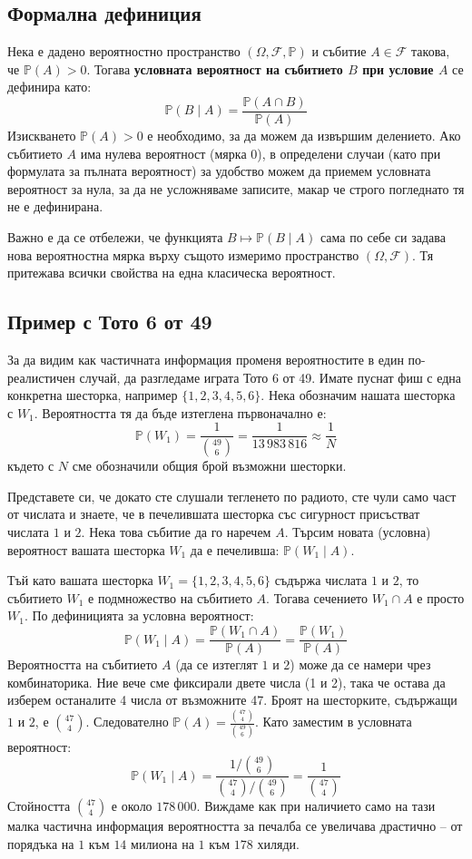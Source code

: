 \documentclass{article}
\begin{document}
\subsection{Формална дефиниция}

Нека е дадено вероятностно пространство $(\Omega, \mathcal{F}, \mathbb{P})$ и събитие $A \in \mathcal{F}$ такова, че $\mathbb{P}(A) > 0$. Тогава \textbf{условната вероятност на събитието $B$ при условие $A$} се дефинира като:
\[
\mathbb{P}(B \mid A) = \frac{\mathbb{P}(A \cap B)}{\mathbb{P}(A)}
\]
Изискването $\mathbb{P}(A) > 0$ е необходимо, за да можем да извършим делението. Ако събитието $A$ има нулева вероятност (мярка $0$), в определени случаи (като при формулата за пълната вероятност) за удобство можем да приемем условната вероятност за нула, за да не усложняваме записите, макар че строго погледнато тя не е дефинирана.

Важно е да се отбележи, че функцията $B \mapsto \mathbb{P}(B \mid A)$ сама по себе си задава нова вероятностна мярка върху същото измеримо пространство $(\Omega, \mathcal{F})$. Тя притежава всички свойства на една класическа вероятност.

\subsection{Пример с Тото 6 от 49}

За да видим как частичната информация променя вероятностите в един по-реалистичен случай, да разгледаме играта Тото 6 от 49. Имате пуснат фиш с една конкретна шесторка, например $\{1, 2, 3, 4, 5, 6\}$. Нека обозначим нашата шесторка с $W_1$.
Вероятността тя да бъде изтеглена първоначално е:
\[
\mathbb{P}(W_1) = \frac{1}{\binom{49}{6}} = \frac{1}{13\,983\,816} \approx \frac{1}{N}
\]
където с $N$ сме обозначили общия брой възможни шесторки.

Представете си, че докато сте слушали тегленето по радиото, сте чули само част от числата и знаете, че в печелившата шесторка със сигурност присъстват числата $1$ и $2$. Нека това събитие да го наречем $A$. Търсим новата (условна) вероятност вашата шесторка $W_1$ да е печеливша: $\mathbb{P}(W_1 \mid A)$.

Тъй като вашата шесторка $W_1 = \{1, 2, 3, 4, 5, 6\}$ съдържа числата $1$ и $2$, то събитието $W_1$ е подмножество на събитието $A$. Тогава сечението $W_1 \cap A$ е просто $W_1$.
По дефиницията за условна вероятност:
\[
\mathbb{P}(W_1 \mid A) = \frac{\mathbb{P}(W_1 \cap A)}{\mathbb{P}(A)} = \frac{\mathbb{P}(W_1)}{\mathbb{P}(A)}
\]
Вероятността на събитието $A$ (да се изтеглят $1$ и $2$) може да се намери чрез комбинаторика. Ние вече сме фиксирали двете числа (1 и 2), така че остава да изберем останалите 4 числа от възможните 47. Броят на шесторките, съдържащи $1$ и $2$, е $\binom{47}{4}$.
Следователно $\mathbb{P}(A) = \frac{\binom{47}{4}}{\binom{49}{6}}$. Като заместим в условната вероятност:
\[
\mathbb{P}(W_1 \mid A) = \frac{1 / \binom{49}{6}}{\binom{47}{4} / \binom{49}{6}} = \frac{1}{\binom{47}{4}}
\]
Стойността $\binom{47}{4}$ е около $178\,000$. Виждаме как при наличието само на тази малка частична информация вероятността за печалба се увеличава драстично – от порядъка на $1$ към $14$ милиона на $1$ към $178$ хиляди.
\end{document}
